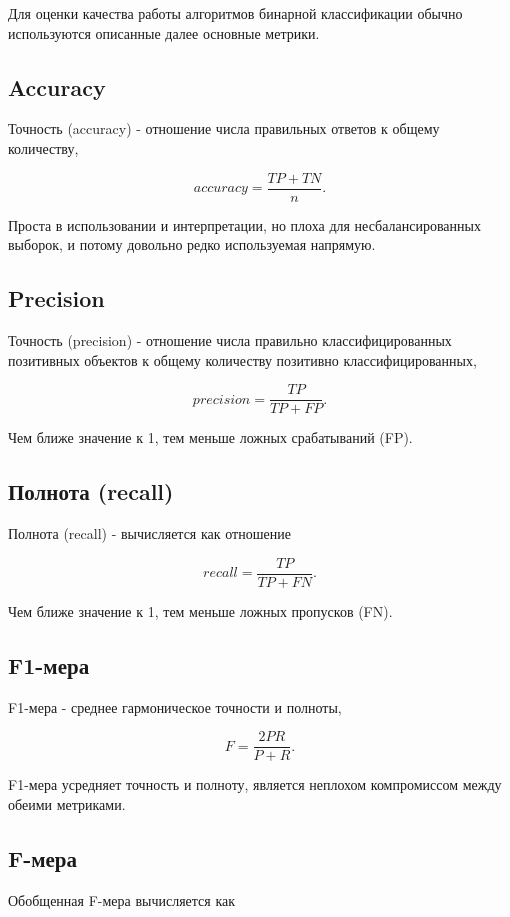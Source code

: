 Для оценки качества работы алгоритмов бинарной классификации обычно используются описанные далее основные метрики.


\subsection{Accuracy}

Точность (accuracy) - отношение числа правильных ответов к общему количеству,

$$
accuracy = \frac{TP + TN}{n}.
$$

Проста в использовании и интерпретации, но плоха для несбалансированных выборок, и потому довольно редко используемая напрямую.

\subsection{Precision}

Точность (precision) - отношение числа правильно классифицированных позитивных объектов к общему количеству позитивно классифицированных,

$$
precision = \frac{TP}{TP + FP}.
$$

Чем ближе значение к 1, тем меньше ложных срабатываний (FP).

\subsection{Полнота (recall)}

Полнота (recall) - вычисляется как отношение

$$
recall = \frac{TP}{TP + FN}.
$$

Чем ближе значение к 1, тем меньше ложных пропусков (FN).

\subsection{F1-мера}

F1-мера - среднее гармоническое точности и полноты,

$$
F = \frac{2PR}{P + R}.
$$

F1-мера усредняет точность и полноту, является неплохом компромиссом между обеими метриками.

\subsection{F-мера}

Обобщенная F-мера вычисляется как

